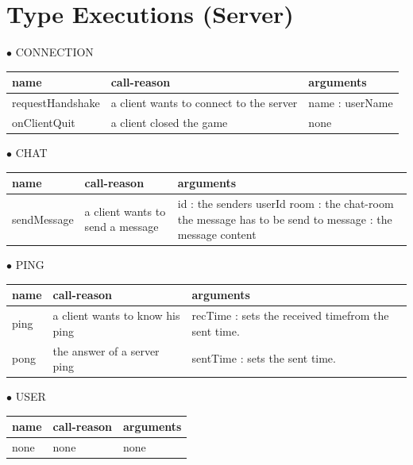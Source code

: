 \documentclass{scrartcl}
\newcommand{\n}{\newline}
\begin{document}
\pagebreak
\section{Type Executions (Server)}
$\bullet$ CONNECTION
\begin{center}
    \begin{tabular}{| p{3.1cm} | p{5cm} | p{5.9cm} |}
        \hline
        \textbf{name} & \textbf{call-reason} & \textbf{arguments} \\ \hline
        requestHandshake & a client wants to connect to the server & name : userName \\ \hline
        onClientQuit & a client closed the game & none \\ \hline
    \end{tabular}
\end{center}
$\bullet$ CHAT
\begin{center}
    \begin{tabular}{| p{3.1cm} | p{5cm} | p{5.9cm} |}
        \hline
        \textbf{name} & \textbf{call-reason} & \textbf{arguments} \\ \hline
        sendMessage & a client wants to send a message & 
        id : the senders userId\n
        room : the chat-room the message has to be send to\n
        message : the message content \\ \hline
    \end{tabular}
\end{center}
$\bullet$ PING
\begin{center}
    \begin{tabular}{| p{3.1cm} | p{5cm} | p{5.9cm} |}
        \hline
        \textbf{name} & \textbf{call-reason} & \textbf{arguments} \\ \hline
        ping & a client wants to know his ping & recTime : sets the received time\n from the sent time. \\ \hline
        pong & the answer of a server ping & sentTime : sets the sent time. \\ \hline
    \end{tabular}
\end{center}
$\bullet$ USER
\begin{center}
    \begin{tabular}{| p{3.1cm} | p{5cm} | p{5.9cm} |}
        \hline
        \textbf{name} & \textbf{call-reason} & \textbf{arguments} \\ \hline
        none & none & none \\ \hline
    \end{tabular}
\end{center}
\end{document}
